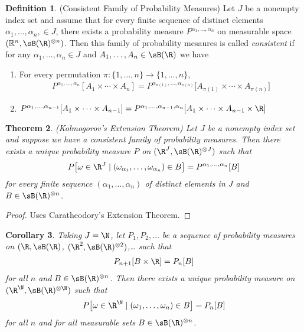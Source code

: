 \documentclass[12pt]{article}
\theoremstyle{plain}
\newtheorem{thm}{Theorem}[section]
\newtheorem{cor}[thm]{Corollary}
\theoremstyle{definition}
\newtheorem{defn}[thm]{Definition}
\theoremstyle{remark}
\newcommand{\ra}{\rightarrow}
\newcommand{\Rn}{\mathbb{R}^n}
\begin{document}
\begin{defn}(Consistent Family of Probability Measures)
Let $J$ be a nonempty index set and assume that for every finite
sequence of distinct elements $\alpha_1,\ldots,\alpha_n,\in J$, there
exists a probability measure $P^{\alpha_1,\ldots,\alpha_n}$ on
measurable space $(\Rn, \sB(\R)^{\otimes n})$. Then this family of
probability mesaures is called \emph{consistent} if for any
$\alpha_1,\ldots,\alpha_n\in J$ and $A_1,\ldots,A_n\in\sB(\R)$ we have
\begin{enumerate}[label=(\roman*)]
  \item For every permutation $\pi: \{1,\ldots,n\}\ra \{1,\ldots,n\}$,
    \begin{align*}
      P^{\alpha_1,\ldots,\alpha_n}[A_1\times \cdots \times A_n]
      =
      P^{\alpha_{\pi(1)},\ldots,\alpha_{\pi(n)}}\big[
          A_{\pi(1)}\times \cdots \times A_{\pi(n)}
      \big]
    \end{align*}
  \item
      $P^{\alpha_1,\ldots,\alpha_{n-1}}[A_1\times \cdots \times A_{n-1}]
      =
      P^{\alpha_1,\ldots,\alpha_{n-1},\alpha_n}[
        A_1\times \cdots \times A_{n-1} \times \R]
      $
\end{enumerate}
\end{defn}

\begin{thm}\emph{(Kolmogorov's Extension Theorem)}
Let $J$ be a nonempty index set and suppose we have a consistent family
of probability measures. Then there exists a \emph{unique} probability
measure $P$ on $(\R^J,\sB(\R)^{\otimes J})$ such that
\begin{align*}
  P\big[
    \omega\in \R^J \; |\; (\omega_{\alpha_1},\ldots,\omega_{\alpha_n})
    \in B
  \big]
  = P^{\alpha_1,\ldots,\alpha_n}[B]
\end{align*}
for every finite sequence $(\alpha_1,\ldots,\alpha_n)$ of distinct
elements in $J$ and $B\in\sB(\R)^{\otimes n}$.
\end{thm}
\begin{proof}
Uses Caratheodory's Extension Theorem.
\end{proof}


\begin{cor}
Taking $J=\N$, let $P_1,P_2,\ldots$ be a sequence of probability
measures on
$(\R,\sB(\R)$,
$(\R^2,\sB(\R)^{\otimes 2})$,\ldots
such that
\begin{align*}
  P_{n+1}[B\times \R] = P_n[B]
\end{align*}
for all $n$ and $B\in\sB(\R)^{\otimes n}$. Then there exists a unique
probability measure on $(\R^{\N},\sB(\R)^{\otimes \N})$ such that
\begin{align*}
  P\big[
    \omega\in \R^{\N} \; |\; (\omega_{1},\ldots,\omega_{n})
    \in B
  \big]
  = P_n[B]
\end{align*}
for all $n$ and for all measurable sets $B\in\sB(\R)^{\otimes n}$.
\end{cor}
\end{document}

